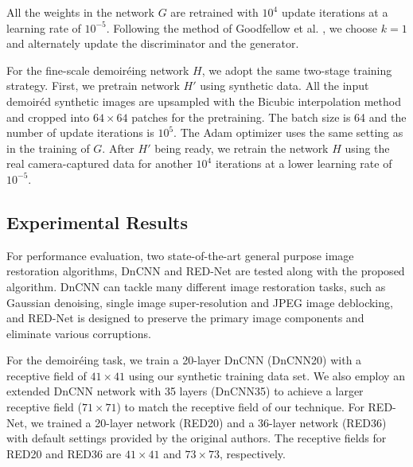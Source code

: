 \documentclass[10pt,twocolumn,letterpaper]{article}
\begin{document}
All the weights in the network $G$ are retrained with $10^4$ update
iterations at a learning rate of $10^{-5}$.  Following the method of
Goodfellow et al. \cite{goodfellow2014generative}, we choose $k = 1$
and alternately update the discriminator and the generator.

For the fine-scale demoir\'eing network $H$, we adopt the same
two-stage training strategy.  First, we pretrain network $H'$ using
synthetic data.  All the input demoir\'ed synthetic images are
upsampled with the Bicubic interpolation method and cropped into
$64\times 64$ patches for the pretraining.  The batch size is 64 and
the number of update iterations is $10^5$.  The Adam optimizer uses
the same setting as in the training of $G$.  After $H'$ being ready,
we retrain the network $H$ using the real camera-captured data for
another $10^4$ iterations at a lower learning rate of $10^{-5}$.

\subsection{Experimental Results}
\label{sec:exp_results}

For performance evaluation, two state-of-the-art general purpose image
restoration algorithms, DnCNN \cite{zhang2017beyond} and RED-Net
\cite{mao2016image} are tested along with the proposed algorithm.
DnCNN can tackle many different image restoration tasks, such as
Gaussian denoising, single image super-resolution and JPEG image
deblocking, and RED-Net is designed to preserve the primary image
components and eliminate various corruptions.

For the demoir\'eing task, we train a 20-layer DnCNN (DnCNN20) with a
receptive field of $41\times 41$ using our synthetic training data
set.  We also employ an extended DnCNN network with 35 layers
(DnCNN35) to achieve a larger receptive field ($71\times 71$) to match
the receptive field of our technique.  For RED-Net, we trained a
20-layer network (RED20) and a 36-layer network (RED36) with default
settings provided by the original authors.  The receptive fields for
RED20 and RED36 are $41\times 41$ and $73\times 73$, respectively.

\begin{table}
  \caption{Average PSNR and SSIM for synthetic data for coarse-scale
    images.}
  \label{tab:psnr_lr}
  \centering
\end{table}
\end{document}
